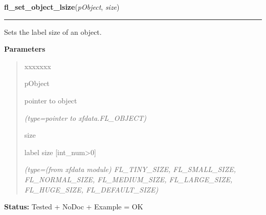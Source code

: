 \hspace{.8\funcindent}\begin{boxedminipage}{\funcwidth}

    \raggedright \textbf{fl\_set\_object\_lsize}(\textit{pObject}, \textit{size})

    \vspace{-1.5ex}

    \rule{\textwidth}{0.5\fboxrule}
\setlength{\parskip}{2ex}
    Sets the label size of an object.

\setlength{\parskip}{1ex}
      \textbf{Parameters}
      \vspace{-1ex}

      \begin{quote}
        \begin{Ventry}{xxxxxxx}

          \item[pObject]

          pointer to object

            {\it (type=pointer to xfdata.FL\_OBJECT)}

          \item[size]

          label size [int\_num{\textgreater}0]

            {\it (type=(from xfdata module) FL\_TINY\_SIZE, FL\_SMALL\_SIZE, FL\_NORMAL\_SIZE, 
FL\_MEDIUM\_SIZE, FL\_LARGE\_SIZE, FL\_HUGE\_SIZE, FL\_DEFAULT\_SIZE)}

        \end{Ventry}

      \end{quote}

\textbf{Status:} Tested + NoDoc + Example = OK



    \end{boxedminipage}

    \label{xformslib:library:fl_get_object_lsize}

    \vspace{0.5ex}

